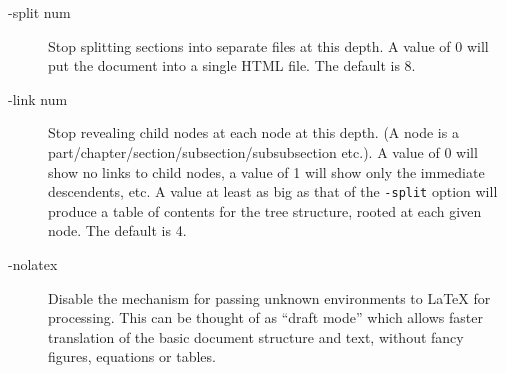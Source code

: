 \begin{description}
\item [-split num]
Stop splitting sections into separate files at this depth.
A value of 0 will put the document into a 
single HTML
file. The default is 8.
\item [-link num]
Stop revealing child nodes at each node at this depth. 
(A node is a part/chapter/section/subsection/subsubsection etc.).
A value of 0 will show no links to child nodes, a value of 1 
will show only the immediate descendents, etc. A value
at least as big as that of the {\tt -split}
option will produce a table of contents for
the tree structure, rooted at each given node. The default is 4.
\label{page:nolatex}
\item [-nolatex ]
Disable the mechanism for passing unknown environments to LaTeX   for processing.
This can be thought of as ``draft mode'' which allows  faster translation of the 
basic document structure and text, without fancy figures, equations or
tables. 


\end{description}
